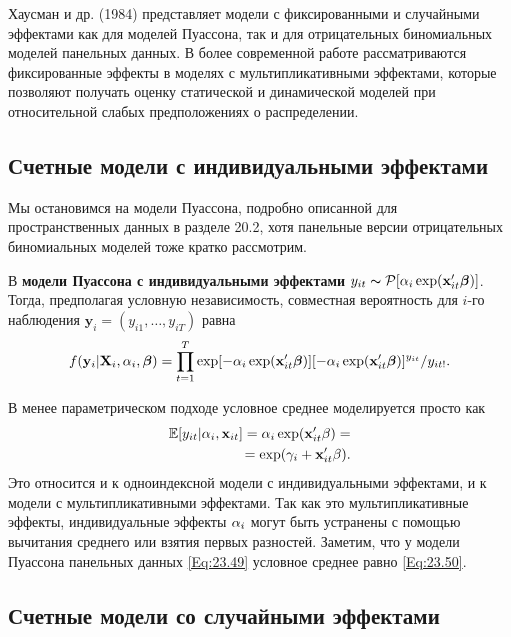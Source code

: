 Хаусман и др. (1984) представляет модели с фиксированными и случайными эффектами как для моделей Пуассона, так и для отрицательных биномиальных моделей панельных данных. В более современной работе рассматриваются фиксированные эффекты в моделях с мультипликативными эффектами,  которые позволяют получать оценку статической и динамической моделей при относительной слабых предположениях о распределении.

\subsection{Счетные модели с индивидуальными эффектами}

Мы остановимся на модели Пуассона, подробно описанной для пространственных данных в разделе 20.2, хотя панельные версии отрицательных биномиальных моделей тоже кратко рассмотрим.

В \textbf{модели Пуассона с индивидуальными эффектами} 
$y_{it} \thicksim \mathcal{P}[\alpha_i \exp (\mathbf{x}'_{it}\bm{\beta})]$.
Тогда, предполагая условную независимость, совместная вероятность 
для $i$-го наблюдения $\mathbf{y}_i=(y_{i1}, \dots, y_{iT})$ равна
\begin{align}
f(\mathbf{y}_i|\mathbf{X}_i, \alpha_i, \bm{\beta})=\prod^T_{t=1} \exp [-\alpha_i \exp (\mathbf{x}'_{it}\bm{\beta})]
[-\alpha_i \exp (\mathbf{x}'_{it}\bm{\beta})]^{y_{it}}/y_{it!}.
\label{Eq:23.49}
\end{align}

В менее параметрическом подходе условное среднее моделируется просто как 
\begin{align}
\mathbb{E}[y_{it}|\alpha_i, \mathbf{x}_{it}] = \alpha_i \exp (\mathbf{x}'_{it} \beta) = 
\label{Eq:23.50} \\
= \exp (\gamma_i+\mathbf{x}'_{it}\beta). \nonumber
\end{align}
Это относится и к одноиндексной модели с индивидуальными эффектами, и к модели с мультипликативными эффектами. Так как это мультипликативные эффекты, индивидуальные эффекты $\alpha_i$ могут быть устранены  с помощью вычитания среднего или взятия первых разностей. Заметим, что у модели Пуассона панельных данных \ref{Eq:23.49} условное среднее равно \ref{Eq:23.50}.

\subsection{Счетные модели со случайными эффектами}

